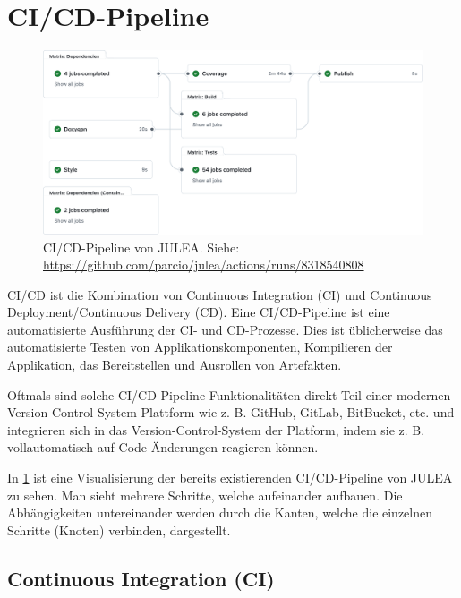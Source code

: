 \section{CI/CD-Pipeline} \label{sec:ci-cd-pipeline}

\begin{figure}[H]
    \includegraphics[width=\textwidth]{./figures/ci-julea-exmaple-full.png}
    \caption{CI/CD-Pipeline von JULEA. \newline
        Siehe: \url{https://github.com/parcio/julea/actions/runs/8318540808}}
    \label{fig:ci-cd-julea-example-full}
\end{figure}

CI/CD ist die Kombination von Continuous Integration (CI) und Continuous Deployment/Continuous Delivery (CD). Eine CI/CD-Pipeline ist eine automatisierte Ausführung der CI- und CD-Prozesse. Dies ist üblicherweise das automatisierte Testen von Applikationskomponenten, Kompilieren der Applikation, das Bereitstellen und Ausrollen von Artefakten. 

Oftmals sind solche CI/CD-Pipeline-Funktionalitäten direkt Teil einer modernen Version-Control-System-Plattform wie z. B. GitHub, GitLab, BitBucket, etc. und integrieren sich in das Version-Control-System der Platform, indem sie z. B. vollautomatisch auf Code-Änderungen reagieren können. 

In \cref{fig:ci-cd-julea-example-full} ist eine Visualisierung der bereits existierenden CI/CD-Pipeline von JULEA zu sehen. Man sieht mehrere Schritte, welche aufeinander aufbauen. Die Abhängigkeiten untereinander werden durch die Kanten, welche die einzelnen Schritte (Knoten) verbinden, dargestellt.


\subsection{Continuous Integration (CI)}

